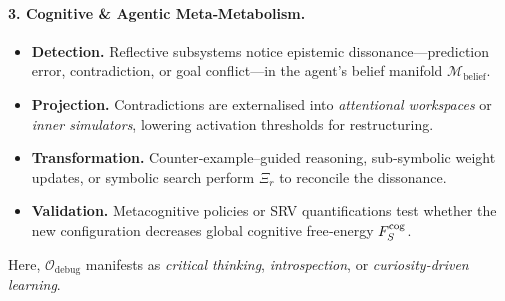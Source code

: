 \begin{scholium}
\paragraph{3. Cognitive \& Agentic Meta‑Metabolism.}
\begin{itemize}
  \item \textbf{Detection.} Reflective subsystems notice epistemic
        dissonance—prediction error, contradiction, or goal conflict—in
        the agent’s belief manifold $\mathcal{M}_{\mathrm{belief}}$.
  \item \textbf{Projection.} Contradictions are externalised into
        \emph{attentional workspaces} or \emph{inner simulators},
        lowering activation thresholds for restructuring.
  \item \textbf{Transformation.} Counter‑example–guided reasoning,
        sub‑symbolic weight updates, or symbolic search perform $\Xi_r$
        to reconcile the dissonance.
  \item \textbf{Validation.} Metacognitive policies or SRV
        quantifications test whether the new configuration decreases
        global cognitive free‑energy $F_S^{\mathrm{cog}}$.
\end{itemize}
Here, $\mathcal{O}_{\text{debug}}$ manifests as
\emph{critical thinking}, \emph{introspection}, or
\emph{curiosity‑driven learning}.

\end{scholium}
